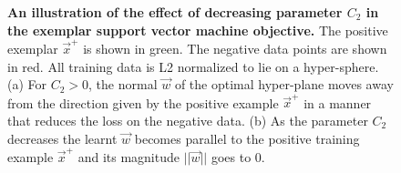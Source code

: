       \begin{figure}[t]
         \begin{center}
            \caption{
               {\bf An illustration of the effect of decreasing parameter $C_2$ in the exemplar support vector machine objective.} 
               The positive exemplar $\vec{x}^+$ is shown in green. The negative data points are shown in red. All training data is L2 normalized to lie on a hyper-sphere. (a) For $C_2>0$, the normal $\vec{w}$ of the optimal hyper-plane moves away from the direction given by the positive example $\vec{x}^+$ in a manner that reduces the loss on the negative data.  (b) As the parameter $C_2$ decreases the learnt $\vec{w}$ becomes parallel to the positive training example $\vec{x}^+$ and its magnitude $||\vec{w}||$ goes to 0.
            }
            \label{fig:C2effect}
         \end{center}
      \end{figure}
%
